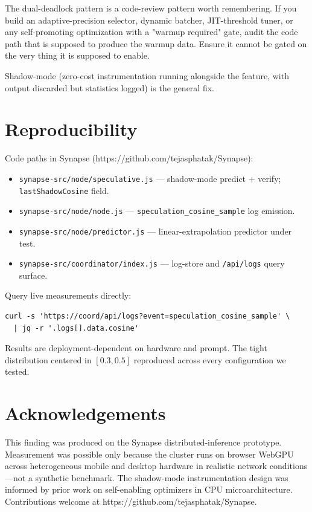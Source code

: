 \documentclass[11pt,letterpaper]{article}
\begin{document}
The dual-deadlock pattern is a code-review pattern worth remembering. If you build an adaptive-precision selector, dynamic batcher, JIT-threshold tuner, or any self-promoting optimization with a "warmup required" gate, audit the code path that is supposed to produce the warmup data. Ensure it cannot be gated on the very thing it is supposed to enable.

Shadow-mode (zero-cost instrumentation running alongside the feature, with output discarded but statistics logged) is the general fix.

\section{Reproducibility}

Code paths in Synapse (https://github.com/tejasphatak/Synapse):
\begin{itemize}
\item \texttt{synapse-src/node/speculative.js} — shadow-mode predict + verify; \texttt{lastShadowCosine} field.
\item \texttt{synapse-src/node/node.js} — \texttt{speculation\_cosine\_sample} log emission.
\item \texttt{synapse-src/node/predictor.js} — linear-extrapolation predictor under test.
\item \texttt{synapse-src/coordinator/index.js} — log-store and \texttt{/api/logs} query surface.
\end{itemize}

Query live measurements directly:
\begin{verbatim}
curl -s 'https://coord/api/logs?event=speculation_cosine_sample' \
  | jq -r '.logs[].data.cosine'
\end{verbatim}

Results are deployment-dependent on hardware and prompt. The tight distribution centered in $[0.3, 0.5]$ reproduced across every configuration we tested.

\section{Acknowledgements}

This finding was produced on the Synapse distributed-inference prototype. Measurement was possible only because the cluster runs on browser WebGPU across heterogeneous mobile and desktop hardware in realistic network conditions—not a synthetic benchmark. The shadow-mode instrumentation design was informed by prior work on self-enabling optimizers in CPU microarchitecture. Contributions welcome at https://github.com/tejasphatak/Synapse.
\end{document}
